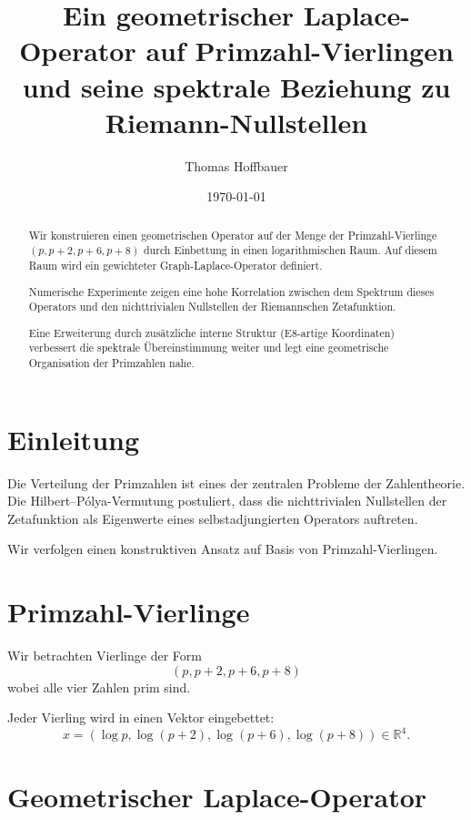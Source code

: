\documentclass[11pt,a4paper]{article}
\title{
	Ein geometrischer Laplace-Operator auf Primzahl-Vierlingen\\
	und seine spektrale Beziehung zu Riemann-Nullstellen
}
\author{
	Thomas Hoffbauer
}
\date{\today}
\begin{document}
	
	\maketitle
	
	\begin{abstract}
		Wir konstruieren einen geometrischen Operator auf der Menge der
		Primzahl-Vierlinge $(p, p+2, p+6, p+8)$ durch Einbettung in einen
		logarithmischen Raum. Auf diesem Raum wird ein gewichteter
		Graph-Laplace-Operator definiert.
		
		Numerische Experimente zeigen eine hohe Korrelation zwischen
		dem Spektrum dieses Operators und den nichttrivialen Nullstellen
		der Riemannschen Zetafunktion.
		
		Eine Erweiterung durch zusätzliche interne Struktur (E8-artige
		Koordinaten) verbessert die spektrale Übereinstimmung weiter
		und legt eine geometrische Organisation der Primzahlen nahe.
	\end{abstract}
	
	\section{Einleitung}
	
	Die Verteilung der Primzahlen ist eines der zentralen Probleme
	der Zahlentheorie. Die Hilbert--Pólya-Vermutung postuliert,
	dass die nichttrivialen Nullstellen der Zetafunktion als
	Eigenwerte eines selbstadjungierten Operators auftreten.
	
	Wir verfolgen einen konstruktiven Ansatz auf Basis von
	Primzahl-Vierlingen.
	
	\section{Primzahl-Vierlinge}
	
	Wir betrachten Vierlinge der Form
	\[
	(p, p+2, p+6, p+8)
	\]
	wobei alle vier Zahlen prim sind.
	
	Jeder Vierling wird in einen Vektor eingebettet:
	\[
	x = (\log p,\log(p+2),\log(p+6),\log(p+8)) \in \mathbb{R}^4.
	\]
	
	\section{Geometrischer Laplace-Operator}
	
\end{document}
